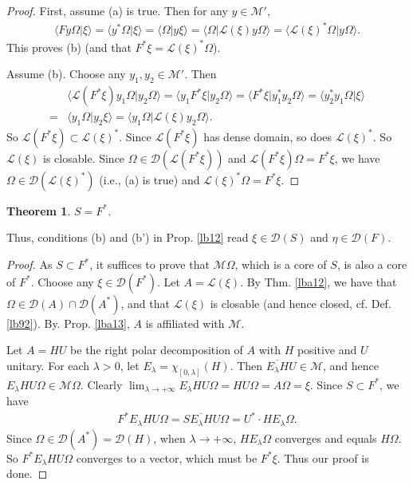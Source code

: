 \documentclass[12pt,b5paper,notitlepage]{article}
\theoremstyle{definition}
\theoremstyle{plain}
\newtheorem{thm}[df]{Theorem}
\newcommand{\mc}{\mathcal}
\newcommand{\Dom}{\scr{D}}
\newcommand{\bk}[1]{\langle {#1}\rangle}
\newcommand{\scr}{\mathscr}
\numberwithin{equation}{section}
\begin{document}
\begin{proof}
First, assume (a) is true. Then for any $y\in\mc M'$,
\begin{align*}
\bk{Fy\Omega|\xi}=\bk{y^*\Omega|\xi}=\bk{\Omega|y\xi}=\bk{\Omega|\scr L(\xi)y\Omega}=\bk{\scr L(\xi)^*\Omega|y\Omega}.
\end{align*}
This proves (b) (and that $F^*\xi=\scr L(\xi)^*\Omega$).

Assume (b). Choose any $y_1,y_2\in\mc M'$. Then
\begin{align*}
&\bk{\scr L(F^*\xi)y_1\Omega|y_2\Omega}=\bk{y_1F^*\xi|y_2\Omega}=\bk{F^*\xi|y_1^*y_2\Omega}=\bk{y_2^*y_1\Omega|\xi}\\
=&\bk{y_1\Omega|y_2\xi}=\bk{y_1\Omega|\scr L(\xi)y_2\Omega}.	
\end{align*}
So $\scr L(F^*\xi)\subset \scr L(\xi)^*$. Since $\scr L(F^*\xi)$ has dense domain, so does $\scr L(\xi)^*$. So $\scr L(\xi)$ is closable. Since $\Omega\in \Dom(\scr L(F^*\xi))$ and $\scr L(F^*\xi)\Omega=F^*\xi$, we have $\Omega\in\Dom(\scr L(\xi)^*)$ (i.e., (a) is true) and $\scr L(\xi)^*\Omega=F^*\xi$.
\end{proof}



\begin{thm}\label{lb93}
	$S=F^*$.
\end{thm}

Thus, conditions (b) and (b') in Prop. \ref{lb12} read $\xi\in\Dom(S)$ and $\eta\in\Dom(F)$.

\begin{proof}
	As $S\subset F^*$, it suffices to prove that $\mathcal M\Omega$, which is a core of $S$, is also a core of $F^*$. Choose any $\xi\in\Dom(F^*)$. Let $A=\scr L(\xi)$. By Thm. \ref{lba12}, we have that $\Omega\in\Dom(A)\cap\Dom(A^*)$, and that $\scr L(\xi)$ is closable (and hence closed, cf. Def. \ref{lb92}). By. Prop. \ref{lba13}, $A$ is affiliated with $\mc M$.

Let $A=HU$ be the right polar decomposition of $A$ with $H$ positive and $U$ unitary. For each $\lambda>0$, let $E_\lambda=\chi_{[0,\lambda]}(H)$. Then $\overline{E_\lambda H}U\in\mathcal M$, and hence $E_\lambda HU\Omega\in\mathcal M\Omega$. Clearly $\lim_{\lambda\rightarrow+\infty}E_\lambda HU\Omega=HU\Omega=A\Omega=\xi$. Since $S\subset F^*$, we have
	\begin{align*}
		F^*E_\lambda HU\Omega=S\overline{E_\lambda H} U\Omega=U^*\cdot HE_\lambda\Omega.
	\end{align*}
Since $\Omega\in\Dom(A^*)=\Dom(H)$, when $\lambda\rightarrow+\infty$, $HE_\lambda\Omega$ converges and equals $H\Omega$. So $F^*E_\lambda HU\Omega$ converges to a vector, which must be $F^*\xi$. Thus our proof is done.
\end{proof}
\end{document}
